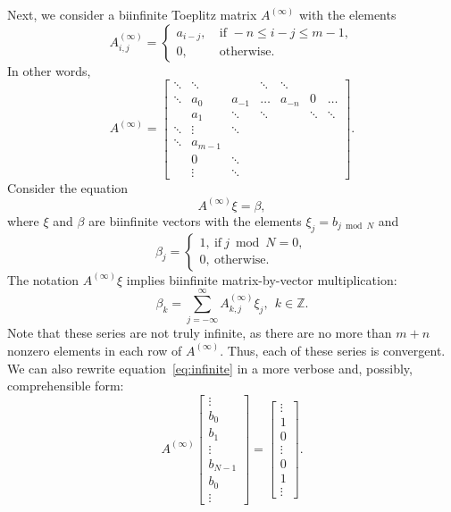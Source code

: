 \documentclass[a4paper]{article}
\newcommand{\Ainf}{A^{(\infty)}}
\begin{document}
	Next, we consider a biinfinite Toeplitz matrix $\Ainf$ with the elements
	\[
	\Ainf_{i,j}
	=
	\begin{cases}
	    a_{i-j},~&\text{if } -n \le i-j \le m-1,\\
	    0,~&\text{otherwise}.
	\end{cases}
	\]
	In other words,
	\[
	\Ainf = \begin{bmatrix}
	\ddots & \ddots &        & \ddots  & \ddots  &        &        \\
	\ddots & a_0    & a_{-1} & \dots   &  a_{-n} &    0   & \dots  \\
	       & a_1    & \ddots & \ddots  &         & \ddots & \ddots \\
	\ddots & \vdots & \ddots &         &         &        &        \\
	\ddots & a_{m-1}&        &         &         &        &        \\
	       & 0      & \ddots &         &         &        &        \\
	       & \vdots & \ddots &         &         &        &        
	\end{bmatrix}.
	\]
	Consider the equation
	\begin{equation}\label{eq:infinite}
	\Ainf \xi = \beta,
	\end{equation}
	where $\xi$ and $\beta$ are biinfinite vectors with the elements
	$\xi_{j} = b_{j \bmod N}$ and 
	\[
	\beta_{j} = \begin{cases}
	    1,~\text{if}~j \bmod N = 0, \\
	    0,~\text{otherwise}.
	\end{cases}
	\]
	The notation $\Ainf\xi$ implies biinfinite matrix-by-vector multiplication:
	\[
	\beta_{k} = \sum_{j=-\infty}^{\infty}\Ainf_{k,j}\xi_{j},~~ k \in \mathbb{Z}.
	\]
	Note that these series are not truly infinite, as there are no more than $m+n$ nonzero elements in each row of $\Ainf$.
	Thus, each of these series is convergent.
	We can also rewrite equation~\eqref{eq:infinite} in a more verbose and, possibly, comprehensible form:
	\[
	\Ainf
	\begin{bmatrix}
	\vdots \\
	b_0 \\
	b_1 \\
	\vdots \\
	b_{N-1} \\
	b_0 \\
	\vdots
	\end{bmatrix}
	=
	\begin{bmatrix}
	\vdots \\
	1 \\
	0 \\
	\vdots \\
	0 \\
	1 \\
	\vdots
	\end{bmatrix}.
	\]
	
\end{document}
